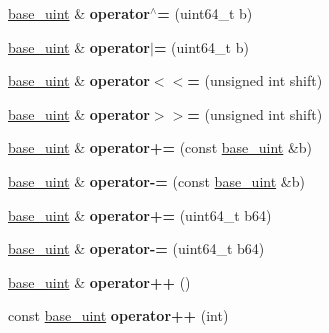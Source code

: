 \begin{DoxyCompactItemize}
\mbox{\hyperlink{classbase__uint}{base\+\_\+uint}} \& {\bfseries operator$^\wedge$=} (uint64\+\_\+t b)
\item 
\mbox{\label{classbase__uint_ac8edb6e097d9eede21f8fa44e9184913}} 
\mbox{\hyperlink{classbase__uint}{base\+\_\+uint}} \& {\bfseries operator$\vert$=} (uint64\+\_\+t b)
\item 
\mbox{\label{classbase__uint_a57a2942a101cdb2e028b3f5b7520110d}} 
\mbox{\hyperlink{classbase__uint}{base\+\_\+uint}} \& {\bfseries operator$<$$<$=} (unsigned int shift)
\item 
\mbox{\label{classbase__uint_a37ed8249249c75a860c809b9b58a478b}} 
\mbox{\hyperlink{classbase__uint}{base\+\_\+uint}} \& {\bfseries operator$>$$>$=} (unsigned int shift)
\item 
\mbox{\label{classbase__uint_a8fb3109e7c46536bb66ac41242176246}} 
\mbox{\hyperlink{classbase__uint}{base\+\_\+uint}} \& {\bfseries operator+=} (const \mbox{\hyperlink{classbase__uint}{base\+\_\+uint}} \&b)
\item 
\mbox{\label{classbase__uint_a89d8332840076ec102839b8a10dda9b4}} 
\mbox{\hyperlink{classbase__uint}{base\+\_\+uint}} \& {\bfseries operator-\/=} (const \mbox{\hyperlink{classbase__uint}{base\+\_\+uint}} \&b)
\item 
\mbox{\label{classbase__uint_a14f2b12970b3198d65abafb2615207ca}} 
\mbox{\hyperlink{classbase__uint}{base\+\_\+uint}} \& {\bfseries operator+=} (uint64\+\_\+t b64)
\item 
\mbox{\label{classbase__uint_ab64f7a7a87b9af5ea345e4678b4cc1e9}} 
\mbox{\hyperlink{classbase__uint}{base\+\_\+uint}} \& {\bfseries operator-\/=} (uint64\+\_\+t b64)
\item 
\mbox{\label{classbase__uint_a56b54869886808961092d3f764fadd9f}} 
\mbox{\hyperlink{classbase__uint}{base\+\_\+uint}} \& {\bfseries operator++} ()
\item 
\mbox{\label{classbase__uint_a2d5a123c856b2b31fae5f65891832486}} 
const \mbox{\hyperlink{classbase__uint}{base\+\_\+uint}} {\bfseries operator++} (int)

\end{DoxyCompactItemize}
